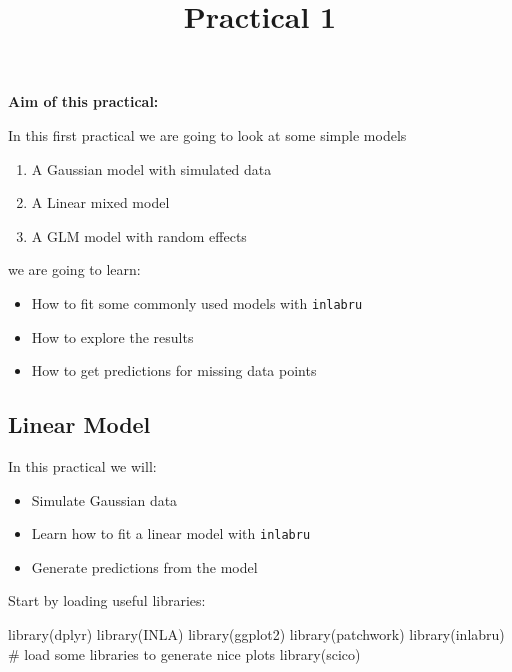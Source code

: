 \documentclass[
  letterpaper,
  DIV=11,
  numbers=noendperiod]{scrartcl}
\title{Practical 1}
\author{}
\date{}
\makeatletter
\newenvironment{Shaded}{\begin{snugshade}}{\end{snugshade}}
\newcommand{\CommentTok}[1]{\textcolor[rgb]{0.37,0.37,0.37}{#1}}
\newcommand{\FunctionTok}[1]{\textcolor[rgb]{0.28,0.35,0.67}{#1}}
\newcommand{\NormalTok}[1]{\textcolor[rgb]{0.00,0.23,0.31}{#1}}
\providecommand{\tightlist}{%
  \setlength{\itemsep}{0pt}\setlength{\parskip}{0pt}}\usepackage{longtable,booktabs,array}
\renewcommand{\maketitle}{\bgroup\setlength{\parindent}{0pt}
\begin{flushleft}
  {\sffamily\huge\textbf{\MakeUppercase{\@title}}} \vspace{0.3cm} \newline
  {\Large {\@subtitle}} \newline
  \@author
\end{flushleft}\egroup
}
\makeatother
\begin{document}
\maketitle

\pagestyle{mystyle}


\textbf{Aim of this practical:}

In this first practical we are going to look at some simple models

\begin{enumerate}
\def\labelenumi{\arabic{enumi}.}
\tightlist
\item
  A Gaussian model with simulated data
\item
  A Linear mixed model
\item
  A GLM model with random effects
\end{enumerate}

we are going to learn:

\begin{itemize}
\tightlist
\item
  How to fit some commonly used models with \texttt{inlabru}
\item
  How to explore the results
\item
  How to get predictions for missing data points
\end{itemize}

\subsection{Linear Model}\label{sec-linmodel}

In this practical we will:

\begin{itemize}
\tightlist
\item
  Simulate Gaussian data
\item
  Learn how to fit a linear model with \texttt{inlabru}
\item
  Generate predictions from the model
\end{itemize}

Start by loading useful libraries:

\begin{Shaded}
\begin{Highlighting}[]
\FunctionTok{library}\NormalTok{(dplyr)}
\FunctionTok{library}\NormalTok{(INLA)}
\FunctionTok{library}\NormalTok{(ggplot2)}
\FunctionTok{library}\NormalTok{(patchwork)}
\FunctionTok{library}\NormalTok{(inlabru)     }
\CommentTok{\# load some libraries to generate nice plots}
\FunctionTok{library}\NormalTok{(scico)}
\end{Highlighting}
\end{Shaded}
\end{document}
